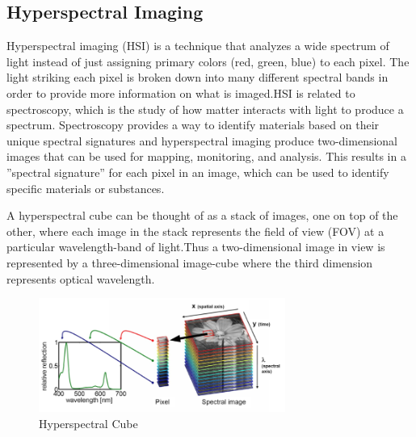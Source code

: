 \documentclass{article}
\begin{document}
{            \subsection{Hyperspectral Imaging}
                \hspace{0.5cm}Hyperspectral imaging (HSI) is a technique that analyzes a wide spectrum of light instead of just assigning primary colors (red, green, blue) to each pixel. The light striking each pixel is broken down into many different spectral bands in order to provide more information on what is imaged.HSI is related to spectroscopy, which is the study of how matter interacts with light to produce a spectrum. Spectroscopy provides a way to identify materials based on their unique spectral signatures and hyperspectral imaging produce two-dimensional images that can be used for mapping, monitoring, and analysis. This results in a ”spectral signature” for each pixel in an image, which can be used to identify specific materials or substances.\par
                A hyperspectral cube can be thought of as a stack of images, one on top of the other, where each image in the stack represents the field of view (FOV) at a particular wavelength-band of light.Thus a two-dimensional image in view is represented by a three-dimensional image-cube where the third dimension represents optical wavelength.\par
                \vspace*{2\baselineskip}
                
                \begin{figure}[htb]
                    \centering
                    \includegraphics[width=0.72\textwidth]{Figures/HyperspectralCube.PNG}
                    \caption{Hyperspectral Cube}
                    \label{fig:example}
                \end{figure}
                
}
\end{document}
